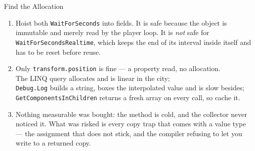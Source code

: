 \begin{solutionframe}{Find the Allocation}
  \begin{enumerate}
    \item Hoist both \texttt{WaitForSeconds} into fields. It is safe because
      the object is immutable and merely read by the player loop. It is
      \emph{not} safe for \texttt{WaitForSecondsRealtime}, which keeps the end
      of its interval inside itself and has to be reset before reuse.
    \item Only \texttt{transform.position} is fine --- a property read, no
      allocation.\\
      The LINQ query allocates and is linear in the city;\\
      \texttt{Debug.Log} builds a string, boxes the interpolated value and is
      slow besides;\\
      \texttt{GetComponentsInChildren} returns a fresh array on
      every call, so cache it.
    \item Nothing measurable was bought: the method is cold, and the collector
      never noticed it. What was risked is every copy trap that comes with a
      value type --- the assignment that does not stick, and the compiler
      refusing to let you write to a returned copy.
  \end{enumerate}
\end{solutionframe}

